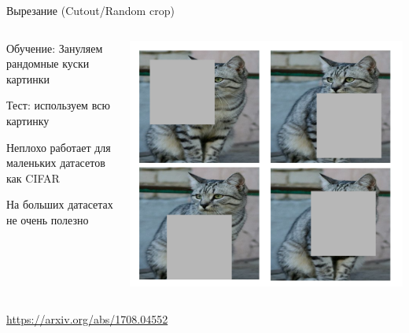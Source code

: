 \documentclass[notes,12pt, aspectratio=169]{beamer}
\newenvironment{wideitemize}{\itemize\addtolength{\itemsep}{10pt}}{\enditemize}
\begin{document}
\begin{frame}{Вырезание (Cutout/Random crop)}
	\begin{columns}[T] %
		\begin{column}{.5\textwidth}
			\begin{wideitemize}
				\item \alert{Обучение:}  Зануляем рандомные куски картинки 
				\item \alert{Тест:}  используем всю картинку
				\item  Неплохо работает для маленьких датасетов как CIFAR
				\item  На больших датасетах не очень полезно
			\end{wideitemize}
		\end{column}%
		\hfill%
		\begin{column}{.5\textwidth}
			\begin{center}
				\includegraphics[width=.8\linewidth]{cutout.png}
			\end{center}
		\end{column}%
	\end{columns}
	\vfill
	\footnotesize
	{\color{blue} \url{https://arxiv.org/abs/1708.04552}}
\end{frame}
\end{document}
